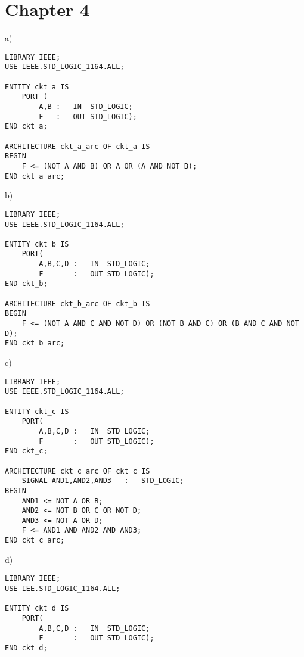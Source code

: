 \section*{Chapter 4}
\begin{enumerate}
	\begin{minipage}{1\linewidth}
	\item a)
		\begin{lstlisting}[]
LIBRARY IEEE;
USE IEEE.STD_LOGIC_1164.ALL;

ENTITY ckt_a IS
	PORT (
		A,B	:	IN	STD_LOGIC;
		F	:	OUT	STD_LOGIC);
END ckt_a;

ARCHITECTURE ckt_a_arc OF ckt_a IS
BEGIN
	F <= (NOT A AND B) OR A OR (A AND NOT B);
END ckt_a_arc;
		\end{lstlisting}
	\end{minipage}
	
	\begin{minipage}{1\linewidth}
		
		b)
		\begin{lstlisting}[]
LIBRARY IEEE;
USE IEEE.STD_LOGIC_1164.ALL;

ENTITY ckt_b IS
	PORT(
		A,B,C,D	:	IN	STD_LOGIC;
		F		:	OUT	STD_LOGIC);
END ckt_b;

ARCHITECTURE ckt_b_arc OF ckt_b IS
BEGIN
	F <= (NOT A AND C AND NOT D) OR (NOT B AND C) OR (B AND C AND NOT D);
END ckt_b_arc;
		\end{lstlisting}
	\end{minipage}
	
	\begin{minipage}{1\linewidth}
		c)
		\begin{lstlisting}[]
LIBRARY IEEE;
USE IEEE.STD_LOGIC_1164.ALL;

ENTITY ckt_c IS
	PORT(
		A,B,C,D	:	IN	STD_LOGIC;
		F		:	OUT	STD_LOGIC);
END ckt_c;

ARCHITECTURE ckt_c_arc OF ckt_c IS
	SIGNAL AND1,AND2,AND3	:	STD_LOGIC;
BEGIN
	AND1 <= NOT A OR B;
	AND2 <= NOT B OR C OR NOT D;
	AND3 <= NOT A OR D;
	F <= AND1 AND AND2 AND AND3;
END ckt_c_arc;
		\end{lstlisting}
	\end{minipage}
	
	\begin{minipage}{1\linewidth}
		d)
		\begin{lstlisting}[]
LIBRARY IEEE;
USE IEE.STD_LOGIC_1164.ALL;

ENTITY ckt_d IS
	PORT(
		A,B,C,D	:	IN	STD_LOGIC;
		F		:	OUT	STD_LOGIC);
END ckt_d;


\end{lstlisting}
\end{minipage}
\end{enumerate}

